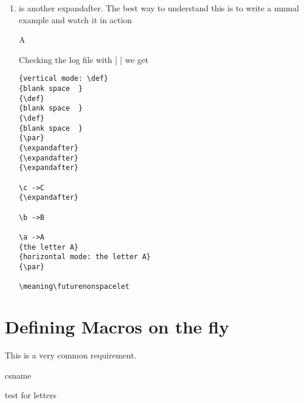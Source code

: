 \begin{enumerate}
\begin{enumerate}
\begin{texexample}{Expansion}{}
\begingroup

\def\a{A}
\def\b{B}
\def\c{C}
\newtoks\ta
\newtoks\tb
\ta = {\a\b\c}
\tb=\expandafter{\the\ta}
\tb={\the\ta}

\texttt{> \the\tb}

\texttt{> \the\ta}

\endgroup
\end{texexample}

\item {} is another expandafter. The best way to understand this is to write a \tex mnmal example and watch it in action

\begin{teX}
  
\def\a{A}
\def\b{B}
\def\c{C}

\expandafter\expandafter\expandafter\a\expandafter\b\c

\bye
\end{teX}

Checking the log file with | | we get

\begin{verbatim}
{vertical mode: \def}
{blank space  }
{\def}
{blank space  }
{\def}
{blank space  }
{\par}
{\expandafter}
{\expandafter}
{\expandafter}

\c ->C
{\expandafter}

\b ->B

\a ->A
{the letter A}
{horizontal mode: the letter A}
{\par}

\meaning\futurenonspacelet
\end{verbatim}


\end{enumerate}


\section{Defining Macros on the fly}

This is a very common requirement. 

\begin{texexample}{csname}{}
\def\newtest#1#2{
  \expandafter\def\csname#1\endcsname{#2}%
}
\newtest{letters}{test for letters}
\end{texexample}





\end{enumerate}









